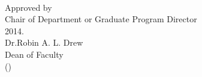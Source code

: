 \documentclass[11pt, a4paper, oneside]{Thesis} %
\begin{document}
    \hspace*{77pt}\@ \supname\\[2.5ex]
    Approved by \hspace{9pt}\underline{\hspace{232pt}}\\
    \hspace*{79pt}Chair of Department or Graduate Program Director\\[6ex]
    \underline{\hspace*{100pt}} \hspace{10pt}  2014. \hspace{48pt} \underline{\hspace{200pt}}\\
    \hspace*{200pt}Dr.\@ Robin A. L. Drew \\
    \hspace*{200pt}Dean of Faculty\\    
    \hspace*{200pt}(\deptname)

\clearpage


\end{document}
